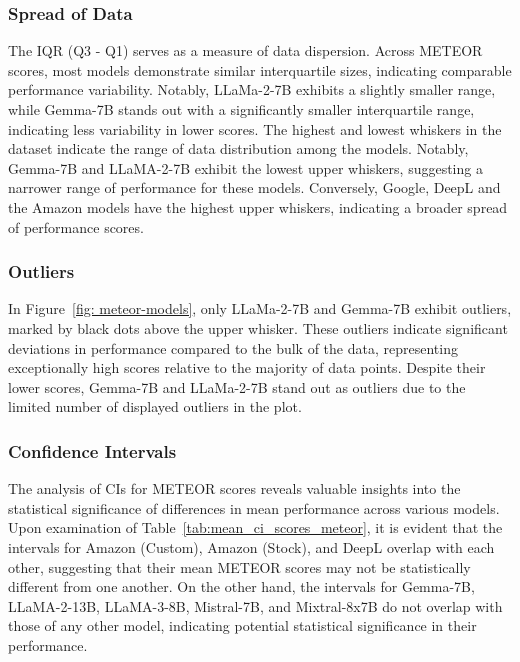 \subsubsection{Spread of Data}

The IQR (Q3 - Q1) serves as a measure of data dispersion. Across METEOR scores, most models demonstrate similar interquartile sizes, indicating comparable performance variability. Notably, LLaMa-2-7B exhibits a slightly smaller range, while Gemma-7B stands out with a significantly smaller interquartile range, indicating less variability in lower scores. The highest and lowest whiskers in the dataset indicate the range of data distribution among the models. Notably, Gemma-7B and LLaMA-2-7B exhibit the lowest upper whiskers, suggesting a narrower range of performance for these models. Conversely, Google, DeepL and the Amazon models have the highest upper whiskers, indicating a broader spread of performance scores. 

\subsubsection{Outliers}

In Figure~\ref{fig: meteor-models}, only LLaMa-2-7B and Gemma-7B exhibit outliers, marked by black dots above the upper whisker. These outliers indicate significant deviations in performance compared to the bulk of the data, representing exceptionally high scores relative to the majority of data points. Despite their lower scores, Gemma-7B and LLaMa-2-7B stand out as outliers due to the limited number of displayed outliers in the plot.


\subsubsection{Confidence Intervals}

The analysis of CIs for METEOR scores reveals valuable insights into the statistical significance of differences in mean performance across various models. Upon examination of Table~\ref{tab:mean_ci_scores_meteor}, it is evident that the intervals for Amazon (Custom), Amazon (Stock), and DeepL overlap with each other, suggesting that their mean METEOR scores may not be statistically different from one another. On the other hand, the intervals for Gemma-7B, LLaMA-2-13B, LLaMA-3-8B, Mistral-7B, and Mixtral-8x7B do not overlap with those of any other model, indicating potential statistical significance in their performance. 

